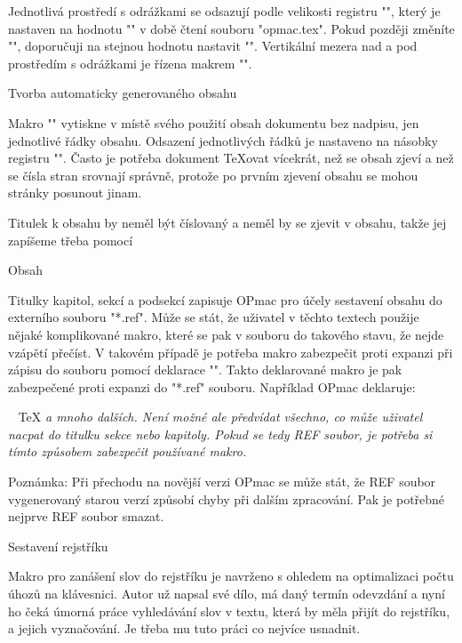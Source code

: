 Jednotlivá prostředí s odrážkami se odsazují podle
velikosti registru "\iindent", který je nastaven na hodnotu "\parindent" v
době čtení souboru "opmac.tex". Pokud později změníte "\parindent",
doporučuji na stejnou hodnotu nastavit "\iindent".
Vertikální mezera nad a pod prostředím s odrážkami je řízena makrem
"\iiskip".

\sec Tvorba automaticky generovaného obsahu

Makro "\maketoc" vytiskne v místě svého použití obsah dokumentu bez nadpisu,
jen jednotlivé řádky obsahu. Odsazení jednotlivých řádků je nastaveno na
násobky registru "\iindent". Často je potřeba dokument \TeX{}ovat vícekrát,
než se obsah zjeví a než se čísla stran srovnají správně, protože po
prvním zjevení obsahu se mohou stránky posunout jinam.

Titulek k obsahu by neměl být číslovaný a neměl by se zjevit v obsahu, takže
jej zapíšeme třeba pomocí

\begtt
\nonum\notoc\sec Obsah
\endtt

Titulky kapitol, sekcí a podsekcí zapisuje OPmac pro účely sestavení obsahu do
externího souboru "*.ref". Může se stát, že uživatel v těchto textech
použije nějaké komplikované makro, které se pak v souboru  do
takového stavu, že nejde vzápětí přečíst. V takovém případě je potřeba
makro zabezpečit proti expanzi při zápisu do souboru pomocí
deklarace "\addprotect\makro". Takto deklarované makro je pak zabezpečené
proti expanzi do "*.ref" souboru. Například OPmac deklaruje:

\begtt
\addprotect~ \addprotect\TeX \addprotect\thefontsize \addprotect\em
\endtt 
%
a mnoho dalších. Není možné ale předvídat všechno, co může uživatel
nacpat do titulku sekce nebo kapitoly. Pokud se tedy 
REF soubor, je potřeba si tímto způsobem zabezpečit používané makro.

Poznámka: Při přechodu na novější verzi OPmac se může stát, že REF soubor
vygenerovaný starou verzí způsobí chyby při dalším zpracování. Pak je
potřebné nejprve REF soubor smazat.


\sec Sestavení rejstříku

Makro pro zanášení slov do rejstříku je navrženo s ohledem na optimalizaci
počtu úhozů na klávesnici. Autor už napsal své dílo, má daný termín
odevzdání a nyní ho čeká úmorná práce vyhledávání slov v textu, která by
měla přijít do rejstříku, a jejich vyznačování. Je třeba mu tuto práci co
nejvíce usnadnit.

